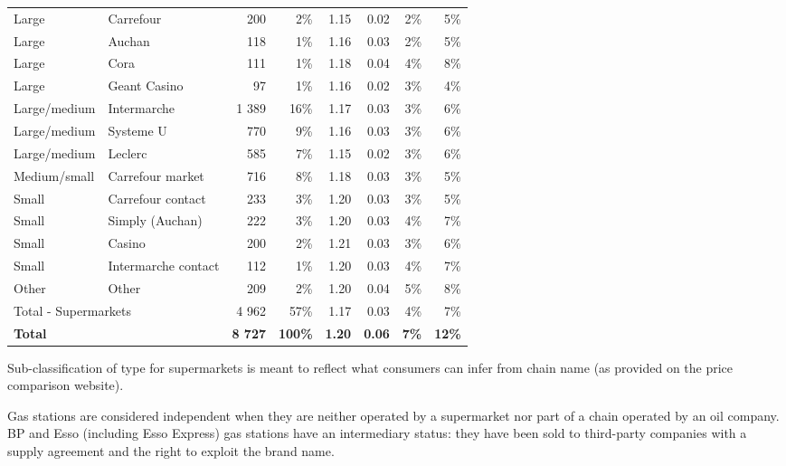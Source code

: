 \documentclass[english]{article}
\begin{document}
\begin{table}
\begin{threeparttable}
\begin{tabular}{llrr|rrrr}
    Large & Carrefour & 200   & 2\%   & 1.15  & 0.02  & 2\%   & 5\% \\
    Large & Auchan & 118   & 1\%   & 1.16  & 0.03  & 2\%   & 5\% \\
    Large & Cora  & 111   & 1\%   & 1.18  & 0.04  & 4\%   & 8\% \\
    Large & Geant Casino & 97    & 1\%   & 1.16  & 0.02  & 3\%   & 4\% \\
    Large/medium & Intermarche & 1 389 & 16\%  & 1.17  & 0.03  & 3\%   & 6\% \\
    Large/medium & Systeme U & 770   & 9\%   & 1.16  & 0.03  & 3\%   & 6\% \\
    Large/medium & Leclerc & 585   & 7\%   & 1.15  & 0.02  & 3\%   & 6\% \\
    Medium/small & Carrefour market & 716   & 8\%   & 1.18  & 0.03  & 3\%   & 5\% \\
    Small & Carrefour contact & 233   & 3\%   & 1.20  & 0.03  & 3\%   & 5\% \\
    Small & Simply (Auchan) & 222   & 3\%   & 1.20  & 0.03  & 4\%   & 7\% \\
    Small & Casino & 200   & 2\%   & 1.21  & 0.03  & 3\%   & 6\% \\
    Small & Intermarche contact & 112   & 1\%   & 1.20  & 0.03  & 4\%   & 7\% \\
    Other & Other & 209   & 2\%   & 1.20  & 0.04  & 5\%   & 8\% \\
    \midrule
    \multicolumn{2}{l}{Total - Supermarkets} & 4 962 & 57\%  & 1.17  & 0.03  & 4\%   & 7\% \\
    \midrule
    \multicolumn{2}{l}{\textbf{Total}} & \textbf{8 727} & \textbf{100\%} & \textbf{1.20} & \textbf{0.06} & \textbf{7\%} & \textbf{12\%} \\
    \bottomrule
    \bottomrule
\end{tabular}
\begin{tablenotes}
			\small
			\item Sub-classification of type for supermarkets is meant to reflect what consumers can infer from chain name (as provided on the price comparison website).
      \item Gas stations are considered independent when they are neither operated by a supermarket nor part of a chain operated by an oil company. BP and Esso (including Esso Express) gas stations  have an intermediary status: they have been sold to third-party companies with a supply agreement and the right to exploit the brand name.
\end{tablenotes}
\end{threeparttable}
\end{table}
\end{document}
